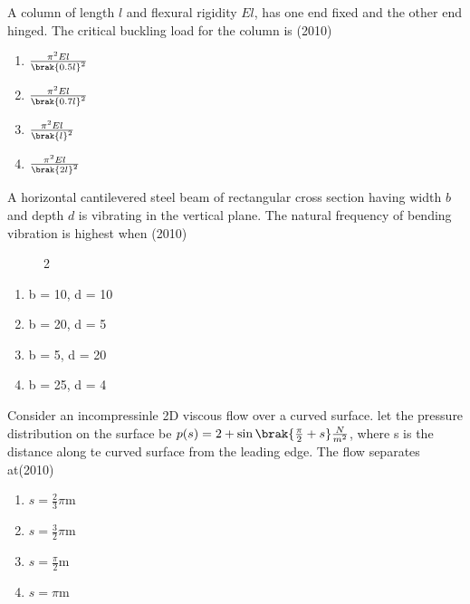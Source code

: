  \item A column of length $l$ and flexural rigidity $El$, has one end fixed and the other end hinged. The critical buckling load for the column is \hfill (2010)
 \begin{enumerate}[label=(\Alph*)]
    \item $\frac{\pi^2El}{\brak{0.5l}^2}$
    \item $\frac{\pi^2El}{\brak{0.7l}^2}$
    \item $\frac{\pi^2El}{\brak{l}^2}$
    \item $\frac{\pi^2El}{\brak{2l}^2}$
 \end{enumerate}
 \item A horizontal cantilevered steel beam of rectangular cross section having width $b$ and depth $d$ is vibrating in the vertical plane. The natural frequency of bending vibration is highest when \hfill (2010)
 \begin{figure}[!ht]
    \centering
    \caption{2}
    \label{fig:2}
\end{figure}
 \begin{enumerate}[label=(\Alph*)]
    \item b = 10, d = 10
    \item b = 20, d = 5
    \item b = 5, d = 20
    \item b = 25, d = 4
 \end{enumerate}
 \item Consider an incompressinle 2D viscous flow over a curved surface. let the pressure distribution on the surface be $p(s) = 2 + \sin\brak{\frac{\pi}{2}+s}\frac{N}{m^2}$, where s is the distance along te curved surface from the leading edge. The flow separates at\hfill (2010)
 \begin{enumerate}[label=(\Alph*)]
    \item $s=\frac{2}{3}\pi$m
    \item $s=\frac{3}{2}\pi$m
    \item $s=\frac{\pi}{2}$m
    \item $s=\pi$m
 \end{enumerate}
